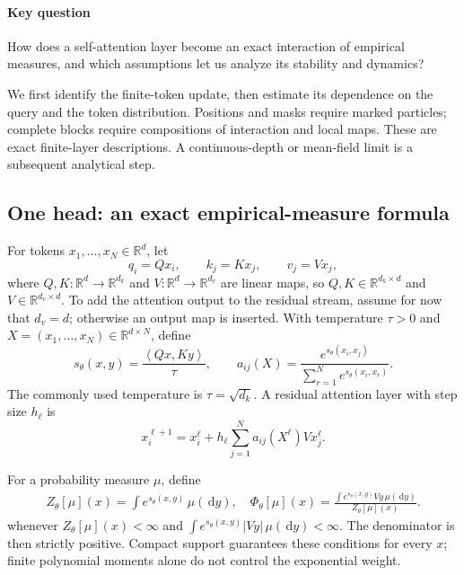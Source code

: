 \documentclass[11pt]{amsart}
\numberwithin{equation}{section}
\theoremstyle{plain}
\newcommand{\R}{\mathbb{R}}
\newcommand{\dd}{\,\mathrm{d}}
\newcommand{\abs}[1]{\left\lvert#1\right\rvert}
\newcommand{\ip}[2]{\left\langle#1,#2\right\rangle}
\begin{document}
\paragraph{\textbf{Key question}}
How does a self-attention layer become an exact interaction of empirical
measures, and which assumptions let us analyze its stability and dynamics?

We first identify the finite-token update, then estimate its dependence on
the query and the token distribution.  Positions and masks require marked
particles; complete blocks require compositions of interaction and local
maps.  These are exact finite-layer descriptions.  A continuous-depth or
mean-field limit is a subsequent analytical step.

\subsection{One head: an exact empirical-measure formula}
For tokens $x_1,\ldots,x_N\in\R^d$, let
\[
  q_i=Qx_i,\qquad k_j=Kx_j,\qquad v_j=Vx_j,
\]
where $Q,K:\R^d\to\R^{d_k}$ and $V:\R^d\to\R^{d_v}$ are linear maps,
so $Q,K\in\R^{d_k\times d}$ and $V\in\R^{d_v\times d}$.  To add the attention
output to the residual stream, assume for now that $d_v=d$; otherwise an output
map is inserted.  With temperature $\tau>0$ and $X=(x_1,\ldots,x_N)\in \R^{d\times N}$, define
\begin{equation}\label{eq:attention-weights}
  s_\theta(x,y)=\frac{\ip{Qx}{Ky}}{\tau},\qquad
  a_{ij}(X)=\frac{e^{s_\theta(x_i,x_j)}}
  {\sum_{r=1}^Ne^{s_\theta(x_i,x_r)}}.
\end{equation}
The commonly used temperature is $\tau=\sqrt{d_k}$.  A residual
attention layer with step size $h_\ell$ is
\begin{equation}\label{eq:attention-layer}
    x_i^{\ell+1}=x_i^\ell+
    h_\ell\sum_{j=1}^Na_{ij}(X^\ell)Vx_j^\ell.
\end{equation}

For a probability measure $\mu$, define
\begin{equation}\label{eq:attention-field}
 \begin{split}
    Z_\theta[\mu](x)
      =\int e^{s_\theta(x,y)}\,\mu(\dd y),\quad 
    \Phi_\theta[\mu](x)
      =\frac{\displaystyle
        \int e^{s_\theta(x,y)}Vy\,\mu(\dd y)}
       {Z_\theta[\mu](x)}.
 \end{split}
\end{equation}
whenever $Z_\theta[\mu](x)<\infty$ and
$\int e^{s_\theta(x,y)}\abs{Vy}\,\mu(\dd y)<\infty$.  The denominator is
then strictly positive.  Compact support guarantees these conditions for
every $x$; finite polynomial moments alone do not control the exponential
weight.
\end{document}
